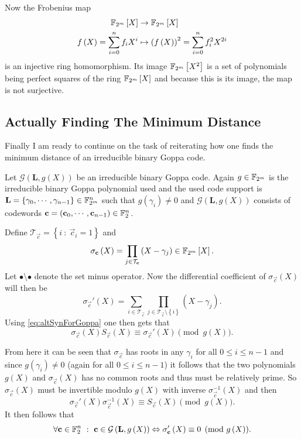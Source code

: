 Now the Frobenius map
\begin{align*}
\mathbb{F}_{2^m}\left[X\right] &\rightarrow \mathbb{F}_{2^m}\left[X\right]\\
f\left(X\right) = \sum\limits_{i=0}^{n} f_i X^i &\mapsto \left(f\left(X\right)\right)^2 = \sum\limits^{n}_{i=0} f_i^2 X^{2i}
\end{align*}
is an injective ring homomorphism. Its image $\mathbb{F}_{2^m}\left[X^2\right]$ is a set of polynomials being perfect squares of the ring $\mathbb{F}_{2^m}\left[X\right]$ and because this is its image, the map is not surjective.



\subsection{Actually Finding The Minimum Distance}

Finally I am ready to continue on the task of reiterating how one finds the minimum distance of an irreducible binary Goppa code.

Let $\mathcal{G}\left(\mathbf{L}, g\left(X\right)\right)$ be an irreducible binary Goppa code. Again $g \in \mathbb{F}_{2^m}$ is the irreducible binary Goppa polynomial used and the used code support is $\mathbf{L} = \left\{ \gamma_0, \cdots , \gamma_{n-1} \right\} \in \mathbb{F}_{2^m}^n$ such that $g\left(\gamma_i\right) \neq 0$  and $\mathcal{G}\left(\mathbf{L}, g\left(X\right)\right)$ consists of codewords $\boldsymbol{\mathrm{c}} = \left(\boldsymbol{\mathrm{c}}_0, \cdots, \boldsymbol{\mathrm{c}}_{n-1}\right) \in \mathbb{F}_{2}^n$.

Define $\mathcal{T}_{\vec{c}} = \left\{ i \ : \ \vec{c}_i = 1 \right\}$ and
\[	
	\sigma_{\boldsymbol{\mathrm{c}}}\left(X\right) = \prod\limits_{j \in \mathcal{T}_{\boldsymbol{\mathrm{c}}}} \left(X - \gamma_j\right) \in \mathbb{F}_{2^m}\left[X\right].
\]
Let $\bullet \setminus \bullet$ denote the set minus operator. Now the differential coefficient of $\sigma_{\vec{c}}\left(X\right)$ will then be
\[
	\sigma_{\vec{c}}'\left(X\right) = \sum\limits_{i \in \mathcal{T}_{\vec{c}}} \prod\limits_{j \in \mathcal{T}_{\vec{c}} \setminus \left\{ i \right\} } \left(X - \gamma_j\right).
\]
Using \cref{eq:altSynForGoppa} one then gets that
\[
	\sigma_{\vec{c}}\left(X\right) S_{\vec{c}}\left(X\right) \equiv \sigma_{\vec{c}}'\left(X\right) \pmod {g\left(X\right)}.
\]

From here it can be seen that $\sigma_{\vec{c}}$ has roots in any $\gamma_i$ for all $0 \leq i \leq n-1$ and since $g\left(\gamma_i\right) \neq 0$ (again for all $0 \leq i \leq n-1$) it follows that the two polynomials $g\left(X\right)$ and $\sigma_{\vec{c}}\left(X\right)$ has no common roots and thus must be relatively prime. So $\sigma_{\vec{c}}\left(X\right)$ must be invertible modulo $g\left(X\right)$ with inverse $\sigma_{\vec{c}}^{-1}\left(X\right)$ and then
\begin{equation}
\label{eq:invOfSigma}
\sigma_{\vec{c}}'\left(X\right) \sigma_{\vec{c}}^{-1}\left(X\right) \equiv S_{\vec{c}}\left(X\right) \pmod {g\left(X\right)}.
\end{equation}
It then follows that
\[	
	\forall \boldsymbol{\mathrm{c}} \in \mathbb{F}_{2}^n \ : \ \boldsymbol{\mathrm{c}} \in \mathcal{G}\left(\mathbf{L}, g\left(X\right)\right) \Leftrightarrow \sigma_{\boldsymbol{\mathrm{c}}}'\left(X\right) \equiv 0 \pmod {g\left(X\right)}.
\]

